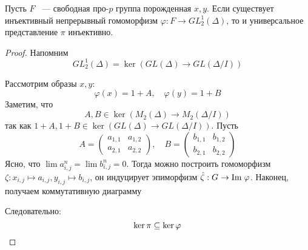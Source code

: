 \vskip 0.1in\noindent
\begin{theorem}[А.Н.\ Зубков, 1987]\label{thm:zubkov-universal}
    Пусть $F$ ~--- свободная про-$p$ группа порожденная $x, y$.
    Если существует инъективный непрерывный гомоморфизм $\varphi: F \to GL^1_2(\Delta)$, то и универсальное представление $\pi$ инъективно.
\end{theorem}
\begin{proof}
    Напомним
    \[
        GL^1_2(\Delta) = \ker{(GL(\Delta)\to GL(\Delta/I))}
    \]

    Рассмотрим образы $x, y$:
    \[
        \varphi(x) = 1 + A, \quad
        \varphi(y) = 1 + B
    \]
    Заметим, что
    \[
        A, B \in \ker{(M_2(\Delta)\to M_2(\Delta/I))}
    \]
    так как $1 + A, 1 + B \in \ker{(GL(\Delta) \to GL(\Delta / I))}$.
    Пусть
    \[
        A=
        \begin{pmatrix}
            a_{1,1} & a_{1,2} \\
            a_{2,1} & a_{2,2}
        \end{pmatrix},
        \quad
        B=
        \begin{pmatrix}
            b_{1,1} & b_{1,2} \\
            b_{2,1} & b_{2,2}
        \end{pmatrix}
    \]
    Ясно, что $\lim a_{i,j}^n = \lim b_{i,j}^n = 0$.
    Тогда можно построить гомоморфизм $\zeta: x_{i,j} \mapsto a_{i,j}, y_{i,j} \mapsto b_{i,j}$, он индуцирует эпиморфизм
    $\hat{\zeta}: G \to \mathrm{Im}\hspace{0.1cm}{\varphi}$.
    Наконец, получаем коммутативную диаграмму
    \begin{center}
    \end{center}
    Следовательно:
    \[
        \ker{\pi} \subseteq \ker{\varphi} \qedhere
    \]

\end{proof}

